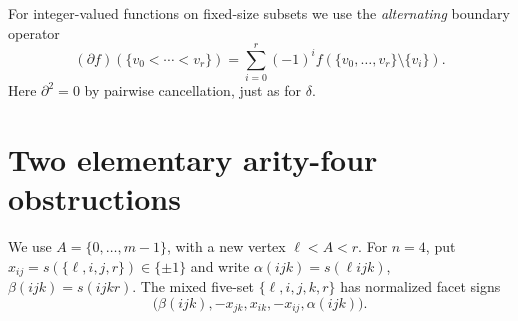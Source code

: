 \documentclass[11pt,a4paper]{article}
\theoremstyle{remark}
\begin{document}
For integer-valued functions on fixed-size subsets we use the
\emph{alternating} boundary operator
\[
 (\partial f)(\{v_0<\cdots<v_r\})
 =\sum_{i=0}^r(-1)^if(\{v_0,\ldots,v_r\}\setminus\{v_i\}).
\]
Here $\partial^2=0$ by pairwise cancellation, just as for $\delta$.

\section{Two elementary arity-four obstructions}\label{sec:arity4}
We use $A=\{0,\ldots,m-1\}$, with a new vertex $\ell<A<r$.
For $n=4$, put $x_{ij}=s(\{\ell,i,j,r\})\in\{\pm1\}$ and
write $\alpha(ijk)=s(\ell ijk)$, $\beta(ijk)=s(ijkr)$.
The mixed five-set $\{\ell,i,j,k,r\}$ has normalized facet signs
\begin{equation}\label{eq:4-packet}
 \bigl(\beta(ijk),-x_{jk},x_{ik},-x_{ij},\alpha(ijk)\bigr).
\end{equation}
\end{document}

